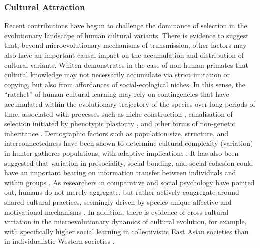 \subsubsection{Cultural Attraction}
Recent contributions have begun to challenge the dominance of selection in the evolutionary landscape of human cultural variants.  There is evidence to suggest that, beyond microevolutionary mechanisms of transmission, other factors may also have an important causal impact on the accumulation and distribution of cultural variants. Whiten \textcite{Whiten2000} demonstrates in the case of non-human primates that cultural knowledge may not necessarily accumulate via strict imitation or copying, but also from affordances of social-ecological niches.  In this sense, the ``ratchet'' of human cultural learning may rely on contingencies that have accumulated within the evolutionary trajectory of the species over long periods of time, associated with processes such as niche construction \citep{Odling-Smee2003}, canalisation of selection initiated by phenotypic plasticity \citep{Godfrey-Smith2017}, and other forms of non-genetic inheritance \citep{Lewens2017}.  Demographic factors such as population size, structure, and interconnectedness have been shown to determine cultural complexity (variation) in hunter gatherer populations, with adaptive implications \citep{Henrich2004}. It has also been suggested that variation in prosociality, social bonding, and social cohesion could have an important bearing on information transfer between individuals and within groups \citep{Heyes2011,Whitehouse2014,Wheatley2016}.  As researchers in comparative and social psychology have pointed out, humans do not merely aggregate, but rather actively congregate around shared cultural practices, seemingly driven by species-unique affective and motivational mechanisms \citep{Dunbar2010,Tomasello2005a}.  In addition, there is evidence of cross-cultural variation in the microevolutionary dynamics of cultural evolution, for example, with specifically higher social learning in collectivistic East Asian societies than in individualistic Western societies \citep{Mesoudi2015,DiYanni2015}.

